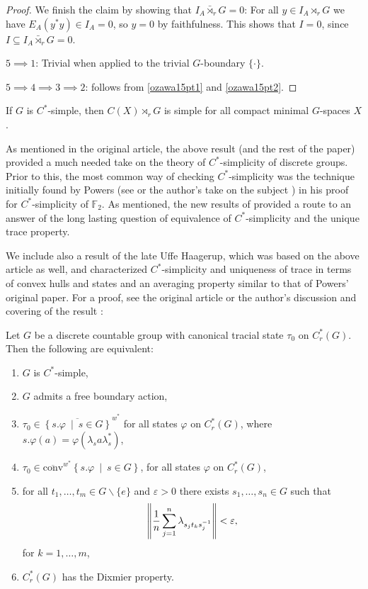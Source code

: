 \begin{proof}
	We finish the claim by showing that $I_A \bar \rtimes_r G = 0$: For all $y \in I_A \rtimes_r G$ we have $E_A(y^*y) \in I_A = 0$, so $y = 0$ by faithfulness. This shows that $I = 0$, since $I \subseteq I_A \bar \rtimes_r G = 0$.

	$5 \implies 1$: Trivial when applied to the trivial $G$-boundary $\{\cdot\}$.

	$5 \implies 4 \implies 3 \implies 2$: follows from \cref{ozawa15pt1} and \cref{ozawa15pt2}.
\end{proof}
\begin{corollary}
	If $G$ is $C^*$-simple, then $C(X) \rtimes_{r}G$ is simple for all compact minimal $G$-spaces $X$.
\end{corollary}
\begin{note}
	As mentioned in the original article, the above result (and the rest of the paper) provided a much needed take on the theory of $C^*$-simplicity of discrete groups. Prior to this, the most common way of checking $C^*$-simplicity was the technique initially found by Powers (see \cite{powers1975simplicity} or the author's take on the subject \cite[chapter 3]{bscp}) in his proof for $C^*$-simplicity of $\mathbb{F}_2$. As mentioned, the new results of \cite{breuillard2017c} provided a route to an answer of the long lasting question of equivalence of $C^*$-simplicity and the unique trace property.
\end{note}
We include also a result of the late Uffe Haagerup, which was based on the above article as well, and characterized $C^*$-simplicity and uniqueness of trace in terms of convex hulls and states and an averaging property similar to that of Powers' original paper. For a proof, see the original article \cite{haagerup2015new} or the author's discussion and covering of the result \cite[Chapter 5]{bscp}:
\begin{theorem}
	Let $G$ be a discrete countable group with canonical tracial state $\tau_0$ on $C_r^*(G)$. Then the following are equivalent:
	\begin{enumerate}
		\item $G$ is $C^*$-simple,
		\item $G$ admits a free boundary action,
		\item $\tau_0 \in\overline{ \left\{ s.\varphi \ \mid \ s \in G \right\}}^{w^*}$ for all states $\varphi $ on $C_r^*(G)$, where $s.\varphi(a) = \varphi(\lambda_s a \lambda_s^*)$,
		\item $\tau_0 \in \overline{\mathrm{conv}}^{w^*}\left\{ s . \varphi \ \mid \ s \in G \right\}$, for all states $\varphi$ on $C_r^*(G)$,
		\item for all $t_1,\dots,t_m \in G\backslash\{e\}$ and $\varepsilon > 0$ there exists $s_1,\dots,s_n \in G$ such that
			\begin{align*}
				\left\lVert \frac1n \sum_{j=1}^n \lambda_{s_jt_ks_j^{-1}}\right\rVert < \varepsilon,
			\end{align*}
			for $k=1,\dots,m$,
		\item $C_r^*(G)$ has the Dixmier property.
	\end{enumerate}
	\label{uffecsimple}
\end{theorem}

